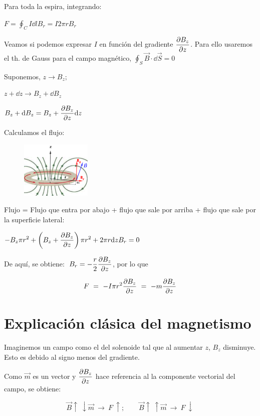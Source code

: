 Para toda la espira, integrando:

$\displaystyle F=\oint_C I\dd l B_r = I 2\pi r B_r$

Veamos si podemos expresar $I$ en función del gradiente $\displaystyle \pdv{B_z}{z}$. Para ello usaremos el th. de Gauss para el campo magnético, $\displaystyle \oint_S \vec B \cdot \dd \vec S=0$

\begin{multicols}{2}
Suponemos, $z\to B_z;$

$ z+\dd z \to B_z+\dd B_z$

$B_z+\dd B_z=\displaystyle B_z+ \pdv{B_z}{z}\dd z$

Calculamos el flujo:
\begin{figure}[H]
	\centering
	\includegraphics[width=0.3\textwidth]{imagenes/imagenes28/T28IM03.png}
\end{figure}	
\end{multicols}

Flujo = Flujo que entra por abajo + flujo que sale por arriba + flujo que sale por la superficie lateral:

$\displaystyle -B_z \pi r^2 + \left( B_z+ \pdv{B_z}{z} \right) \pi r^2 + 2\pi r \dd z B_r = 0$

De aquí, se obtiene: $\ B_r=-\dfrac r 2 \displaystyle \pdv{B_z}{z}$, por lo que

$$F \ = \ -I\pi r^2 \displaystyle \pdv{B_z}{z} \ = \ -m\pdv{B_z}{z}$$

\section{Explicación clásica del magnetismo}


Imaginemos un campo como el del solenoide tal que al aumentar $z$, $B_z$ disminuye. Esto es debido al signo menos del gradiente.

Como $\vec m$ es un vector y $\displaystyle \pdv{B_z}{z}$ hace referencia al la componente vectorial del campo, se obtiene:

$$\vec B \uparrow \ \downarrow \vec m \ \to \ F \ \uparrow ;\qquad 
  \vec B \uparrow \ \uparrow \vec m \ \to \ F \ \downarrow$$

